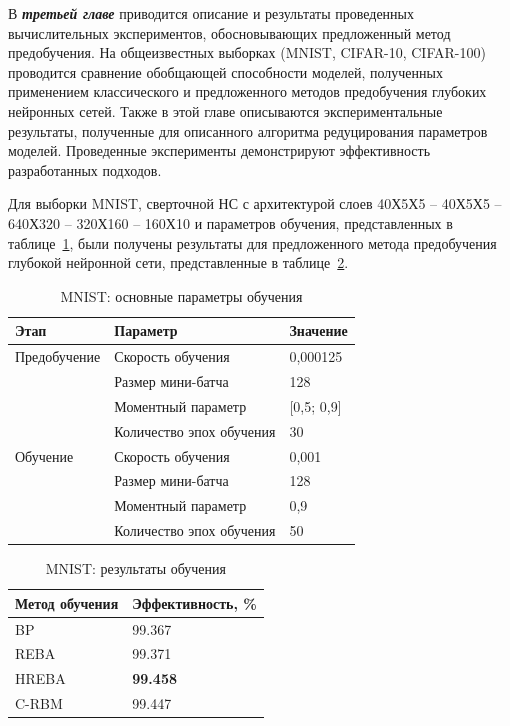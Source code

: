 \documentclass{thesisby}
\begin{document}
В \textbf{\textit{третьей главе}} приводится описание и результаты проведенных вычислительных экспериментов, обосновывающих предложенный метод предобучения. На общеизвестных выборках (MNIST, CIFAR-10, CIFAR-100) проводится сравнение обобщающей способности моделей, полученных применением классического и предложенного методов предобучения глубоких нейронных сетей. Также в этой главе описываются экспериментальные результаты, полученные для описанного алгоритма редуцирования параметров моделей. Проведенные эксперименты демонстрируют эффективность разработанных подходов.
	
Для выборки MNIST, сверточной НС с архитектурой слоев 40Х5Х5 -- 40Х5Х5 -- 640Х320 -- 320Х160 -- 160Х10 и параметров обучения, представленных в таблице~\ref{table:params_mnist}, были получены результаты для предложенного метода предобучения глубокой нейронной сети, представленные в таблице~\ref{table:results_mnist}.
	
\begin{table} [!h]
  \small
  \caption{MNIST: основные параметры обучения}\label{table:params_mnist}
\centering
\begin{tabular}{| p{3cm} | p{6cm} | p{2cm} |}
  \hline
    \textbf{Этап} & \textbf{Параметр} & \textbf{Значение}\\
    \hline
    Предобучение & Скорость обучения & 0,000125\\
    \cline{2-3}
    & Размер мини-батча & 128 \\
    \cline{2-3}
    & Моментный параметр & [0,5; 0,9] \\
    \cline{2-3}
    & Количество эпох обучения & 30\\
    \hline
    Обучение & Скорость обучения & 0,001\\
    \cline{2-3}
    & Размер мини-батча & 128 \\
    \cline{2-3}
    & Моментный параметр & 0,9 \\
    \cline{2-3}
    & Количество эпох обучения & 50\\
    \hline
\end{tabular}
\end{table}

\begin{table} [!h]
  \small
  \caption{MNIST: результаты обучения}\label{table:results_mnist}
\centering
\begin{tabular}{| p{6cm} | p{6cm} |}
  \hline
    \textbf{Метод обучения} & \textbf{Эффективность, \%}\\
    \hline
    BP & 99.367\\
    \hline
    REBA & 99.371\\
    \hline
    HREBA & \textbf{99.458}\\
    \hline
    C-RBM & 99.447\\
    \hline
\end{tabular}
\end{table}
\end{document}
